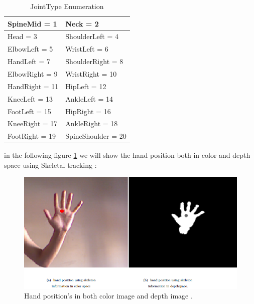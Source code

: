 \begin{table}[H]
\centering
\caption{JointType Enumeration}
 \label{table:t1} 
\begin{tabu} to 0.5\textwidth { | X[l] | X[r] | }

 \hline
 SpineMid = 1  & Neck = 2    \\
 \hline 
 Head = 3  &  ShoulderLeft = 4    \\
\hline
  ElbowLeft = 5   &  WristLeft = 6    \\
\hline

 HandLeft =	7  &   ShoulderRight = 8    \\
\hline
 
ElbowRight = 9  &  WristRight = 10   \\
\hline
 
 HandRight = 11  &  HipLeft = 12   \\
\hline
 
 KneeLeft = 13  &  AnkleLeft = 14   \\
\hline
 
FootLeft = 15  &  HipRight = 16   \\
\hline
 
 KneeRight = 17  & AnkleRight = 18     \\
\hline

FootRight = 19   & SpineShoulder = 20     \\

\hline

 \end{tabu}


 \end{table}

in the following figure \ref{fig:cam9} we will show the hand position both in color and depth space using Skeletal tracking  :

\begin{figure}[H]
\centering
\includegraphics[width= 1.0\textwidth]{img/colorvsdepth.PNG}

\caption {Hand position's in both color image and depth image .
\label{fig:cam9}}

\end{figure}


